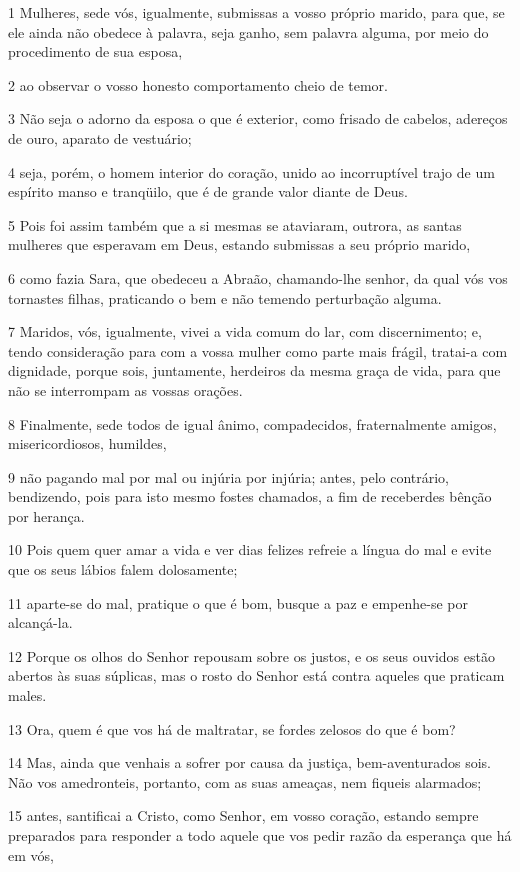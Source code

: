 \par 1 Mulheres, sede vós, igualmente, submissas a vosso próprio marido, para que, se ele ainda não obedece à palavra, seja ganho, sem palavra alguma, por meio do procedimento de sua esposa,
\par 2 ao observar o vosso honesto comportamento cheio de temor.
\par 3 Não seja o adorno da esposa o que é exterior, como frisado de cabelos, adereços de ouro, aparato de vestuário;
\par 4 seja, porém, o homem interior do coração, unido ao incorruptível trajo de um espírito manso e tranqüilo, que é de grande valor diante de Deus.
\par 5 Pois foi assim também que a si mesmas se ataviaram, outrora, as santas mulheres que esperavam em Deus, estando submissas a seu próprio marido,
\par 6 como fazia Sara, que obedeceu a Abraão, chamando-lhe senhor, da qual vós vos tornastes filhas, praticando o bem e não temendo perturbação alguma.
\par 7 Maridos, vós, igualmente, vivei a vida comum do lar, com discernimento; e, tendo consideração para com a vossa mulher como parte mais frágil, tratai-a com dignidade, porque sois, juntamente, herdeiros da mesma graça de vida, para que não se interrompam as vossas orações.
\par 8 Finalmente, sede todos de igual ânimo, compadecidos, fraternalmente amigos, misericordiosos, humildes,
\par 9 não pagando mal por mal ou injúria por injúria; antes, pelo contrário, bendizendo, pois para isto mesmo fostes chamados, a fim de receberdes bênção por herança.
\par 10 Pois quem quer amar a vida e ver dias felizes refreie a língua do mal e evite que os seus lábios falem dolosamente;
\par 11 aparte-se do mal, pratique o que é bom, busque a paz e empenhe-se por alcançá-la.
\par 12 Porque os olhos do Senhor repousam sobre os justos, e os seus ouvidos estão abertos às suas súplicas, mas o rosto do Senhor está contra aqueles que praticam males.
\par 13 Ora, quem é que vos há de maltratar, se fordes zelosos do que é bom?
\par 14 Mas, ainda que venhais a sofrer por causa da justiça, bem-aventurados sois. Não vos amedronteis, portanto, com as suas ameaças, nem fiqueis alarmados;
\par 15 antes, santificai a Cristo, como Senhor, em vosso coração, estando sempre preparados para responder a todo aquele que vos pedir razão da esperança que há em vós,
